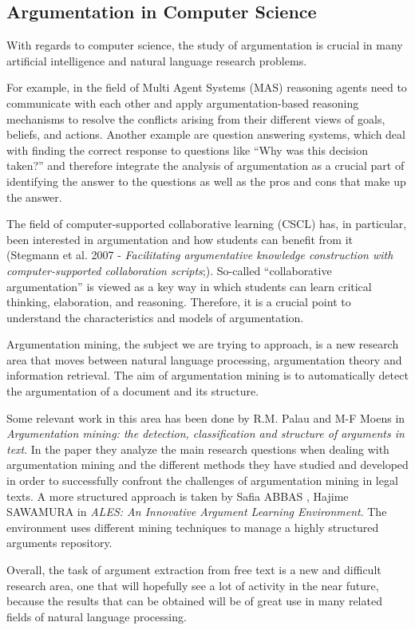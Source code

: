 \documentclass[lnbip]{svmultln}
\begin{document}
\subsection{Argumentation in Computer Science}
\par
With regards to computer science, the study of argumentation is crucial in many artificial intelligence and natural language research problems.
\par
For example, in the field of Multi Agent Systems (MAS) reasoning agents need to communicate with each other and apply argumentation-based reasoning mechanisms to resolve the conflicts arising from their different views of goals, beliefs, and actions.
Another example are question answering systems, which deal with finding the correct response to questions like ``Why was this decision taken?'' and therefore integrate the analysis of argumentation as a crucial part of identifying the answer to the questions as well as the pros and cons that make up the answer.
\par
The field of computer-supported collaborative learning (CSCL) has, in particular, been interested in argumentation and how students can benefit from it (Stegmann et al. 2007 - \textit{Facilitating argumentative knowledge construction with computer-supported collaboration scripts};). So-called ``collaborative argumentation'' is viewed as a key way in which students can learn critical thinking, elaboration, and reasoning.
Therefore, it is a crucial point to understand the characteristics and models of argumentation.
\par
Argumentation mining, the subject we are trying to approach, is a new research area that moves between natural language processing, argumentation theory and information retrieval. The aim of argumentation mining is to automatically detect the argumentation of a document and its structure.
\par
Some relevant work in this area has been done by R.M. Palau and M-F Moens in \textit{Argumentation mining: the detection, classification and structure of arguments in text}. In the paper they analyze the main research questions when dealing with argumentation mining and the different methods they have studied and developed in order to successfully confront the challenges of argumentation mining in legal texts.
A more structured approach is taken by Safia ABBAS , Hajime SAWAMURA in \textit{ALES: An Innovative Argument Learning Environment}. The environment uses different mining techniques to manage a highly structured arguments repository.
 \par
Overall, the task of argument extraction from free text is a new and difficult research area, one that will hopefully see a lot of activity in the near future, because the results that can be obtained will be of great use in many related fields of natural language processing.
\end{document}
